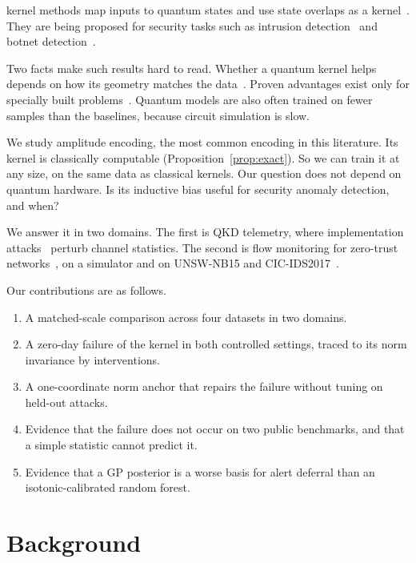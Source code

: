 \documentclass[journal]{IEEEtran}
\begin{document}
 kernel methods map inputs to quantum states and use state
overlaps as a kernel~\cite{havlicek2019supervised,schuld2021machine}. They are
being proposed for security tasks such as intrusion
detection~\cite{kalinin2023security} and botnet
detection~\cite{suryotrisongko2022evaluating}.

Two facts make such results hard to read. Whether a quantum kernel helps depends
on how its geometry matches the data~\cite{huang2021power}. Proven advantages
exist only for specially built problems~\cite{liu2021rigorous}. Quantum models are
also often trained on fewer samples than the baselines, because circuit
simulation is slow.

We study amplitude encoding, the most common encoding in this literature. Its
kernel is classically computable (Proposition~\ref{prop:exact}). So we can train it
at any size, on the same data as classical kernels. Our question does not depend
on quantum hardware. Is its inductive bias useful for security anomaly detection,
and when?

We answer it in two domains. The first is QKD telemetry, where implementation
attacks~\cite{huttner1995photon,lydersen2010hacking,gisin2006trojan,bennett1992experimental}
perturb channel statistics. The second is flow monitoring for zero-trust
networks~\cite{rose2020zero,syed2022zero}, on a simulator and on UNSW-NB15 and
CIC-IDS2017~\cite{moustafa2015unsw,sharafaldin2018toward}.

Our contributions are as follows.
\begin{enumerate}
\item A matched-scale comparison across four datasets in two domains.
\item A zero-day failure of the kernel in both controlled settings, traced to its
  norm invariance by interventions.
\item A one-coordinate norm anchor that repairs the failure without tuning on
  held-out attacks.
\item Evidence that the failure does not occur on two public benchmarks, and that
  a simple statistic cannot predict it.
\item Evidence that a GP posterior is a worse basis for alert deferral than an
  isotonic-calibrated random forest.
\end{enumerate}

\section{Background}
\end{document}
